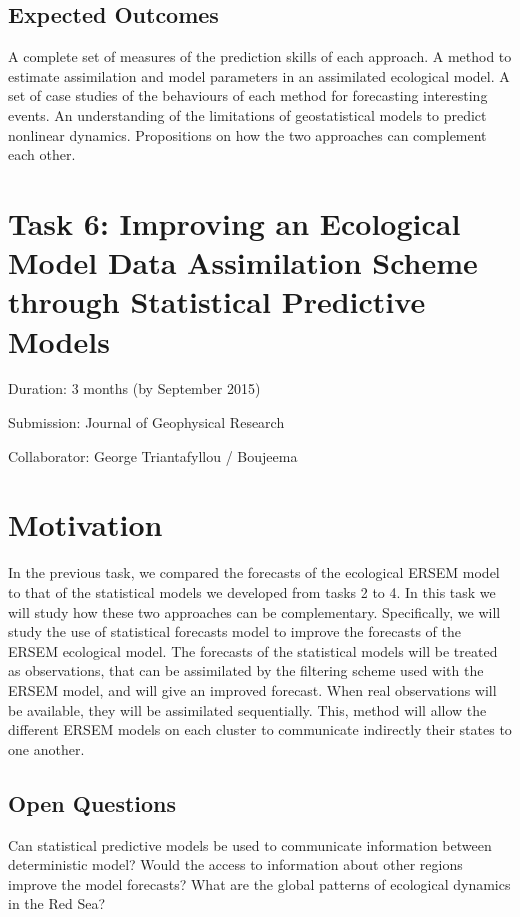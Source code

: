 \subsection{Expected Outcomes}

A complete set of measures of the prediction skills of each approach.
A method to estimate assimilation and model parameters in an assimilated ecological model.
A set of case studies of the behaviours of each method for forecasting interesting events.
An understanding of the limitations of geostatistical models to predict nonlinear dynamics. 
Propositions on how the two approaches can complement each other.

\section{Task 6: Improving an Ecological Model Data Assimilation Scheme through Statistical Predictive Models}

Duration: 3 months (by September 2015)

Submission: Journal of Geophysical Research 

Collaborator: George Triantafyllou / Boujeema

\section{Motivation}

In the previous task, we compared the forecasts of the ecological ERSEM model to that of the statistical models we developed from tasks 2 to 4. In this task we will study how these two approaches can be complementary. Specifically, we will study the use of statistical forecasts model to improve the forecasts of the ERSEM ecological model. The forecasts of the statistical models will be treated as observations, that can be assimilated by the filtering scheme used with the ERSEM model, and will give an improved forecast. When real observations will be available, they will be assimilated sequentially. This, method will allow the different ERSEM models on each cluster to communicate indirectly their states to one another. 

\subsection{Open Questions}

Can statistical predictive models be used to communicate information between deterministic model?
Would the access to information about other regions improve the model forecasts?
What are the global patterns of ecological dynamics in the Red Sea?

